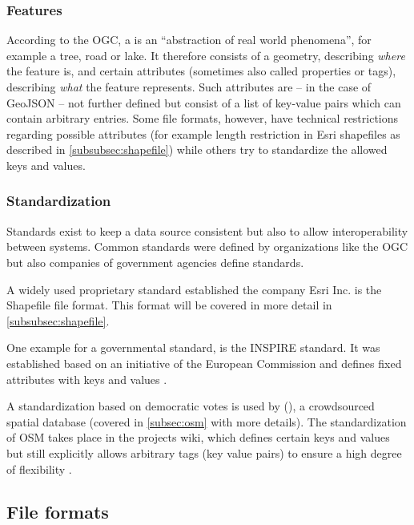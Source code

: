 		\subsubsection{Features}
		
			According to the OGC, a  is an \enquote{abstraction of real world phenomena}\cite{ogc-sfa}, for example a tree, road or lake.
			It therefore consists of a geometry, describing \textit{where} the feature is, and certain attributes (sometimes also called properties or tags), describing \textit{what} the feature represents.
			Such attributes are -- in the case of GeoJSON -- not further defined but consist of a list of key-value pairs which can contain arbitrary entries.
			Some file formats, however, have technical restrictions regarding possible attributes (for example length restriction in Esri shapefiles as described in \cref{subsubsec:shapefile}) while others try to standardize the allowed keys and values.
		
		\subsubsection{Standardization}
		
			Standards exist to keep a data source consistent but also to allow interoperability between systems.
			Common standards were defined by organizations like the OGC but also companies of government agencies define standards.
			
			A widely used proprietary standard established the company Esri Inc. is the Shapefile file format.
			This format will be covered in more detail in \cref{subsubsec:shapefile}.
			
			One example for a governmental standard, is the INSPIRE standard.
			It was established based on an initiative of the European Commission and defines fixed attributes with keys and values \cite[31]{inspire-protected-sites}.
		
			A standardization based on democratic votes is used by  (), a crowdsourced spatial database (covered in \cref{subsec:osm} with more details).
			The standardization of OSM takes place in the projects wiki, which defines certain keys and values but still explicitly allows arbitrary tags (key value pairs) to ensure a high degree of flexibility \cite{osm-wiki-proposal-process}.
			
	\subsection{File formats}
	\label{subsec:file-formats}
	
